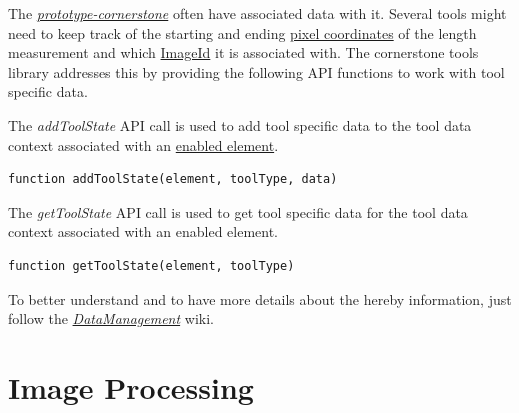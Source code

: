 \documentclass{tufte-book} %
\begin{document}
\hfill

The \href{https://github.com/MIMBCD-UI/prototype-cornerstone}{\textit{prototype-cornerstone}} often have associated data with it. Several tools might need to keep track of the starting and ending \href{https://github.com/cornerstonejs/cornerstone/wiki/Pixel-Coordinate-System}{pixel coordinates} of the length measurement and which \href{https://github.com/cornerstonejs/cornerstone/wiki/ImageIds}{ImageId} it is associated with. The cornerstone tools library addresses this by providing the following API functions to work with tool specific data.

\hfill

The \textit{addToolState} API call is used to add tool specific data to the tool data context associated with an \href{https://github.com/cornerstonejs/cornerstone/wiki/enabled-element}{enabled element}.

\hfill

\begin{lstlisting}
function addToolState(element, toolType, data)
\end{lstlisting}

\hfill

The \textit{getToolState} API call is used to get tool specific data for the tool data context associated with an enabled element.

\hfill

\begin{lstlisting}
function getToolState(element, toolType)
\end{lstlisting}

\hfill

To better understand and to have more details about the hereby information, just follow the \href{https://github.com/cornerstonejs/cornerstoneTools/wiki/DataManagement}{\textit{DataManagement}} wiki.


\chapter{Image Processing}
\end{document}
